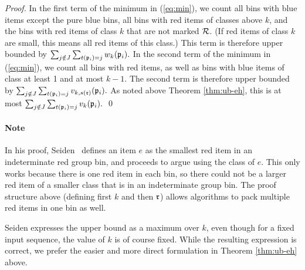 \begin{proof}
	In the first term of the minimum in (\ref{eq:min}), we count all bins with blue items
	except the pure blue bins, all bins with red items of classes
	above $k$, and the bins with red items of class $k$ that are not marked $\mathcal{R}$.
	(If red items of class $k$ are small, this means all red items of this class.)
This term is therefore upper bounded by 
	$\sum_{j\notin J} \sum_{t(\mathfrak{p}_i)=j} w_k(\mathfrak{p}_i).
	$
In the second term of the minimum in (\ref{eq:min}), we count all bins with red items, as well
	as bins with blue items of class at least 1 and at most $k-1$.
The second term is therefore  upper bounded by  
	$\sum_{j\notin J} \sum_{t(\mathfrak{p}_i)=j} v_{k,s(\mathfrak{r})}(\mathfrak{p}_i).
	$
	As noted above Theorem \ref{thm:ub-eh}, this is at most $\sum_{j\notin J} \sum_{t(\mathfrak{p}_i)=j} v_{k}(\mathfrak{p}_i).
	$
	\qed\end{proof}

\paragraph{Note} In his proof, Seiden~\cite{Seiden02} defines an item $e$ as the smallest red item in an indeterminate red group bin, and proceeds to argue using the class of $e$. This only works because there is one red item in each bin, so there could not be a larger red item of a smaller class that is in an indeterminate group bin. The proof structure above (defining first $k$ and then $\mathfrak{r}$) allows {\SuperH} algorithms to pack multiple red items in one bin as well.

Seiden expresses the upper bound as a maximum over $k$, even though for 
a fixed input sequence, the value of $k$ is of course fixed. 
While the resulting expression is correct, we prefer the easier and more direct formulation in Theorem \ref{thm:ub-eh} above.
\iffalse However, this may have been introduced 
to properly cover the case $E=0$: the inequalities proved for $E$ do not hold if $E=0$,
as can be seen for an output consisting mostly of blue items (the first inequality requires that
there are more bins with red items than with blue items in this case, which does not have to hold)
\fi 













